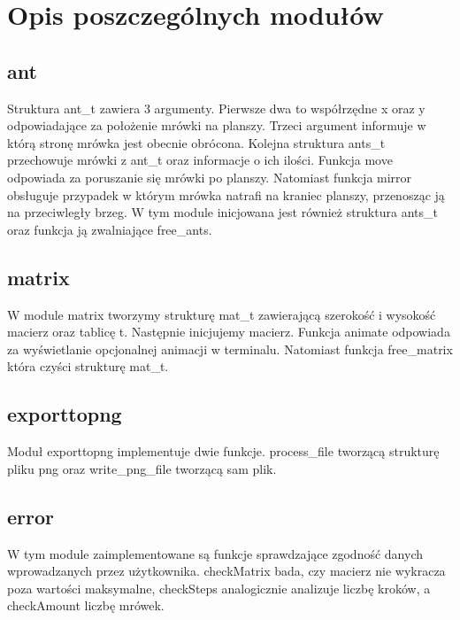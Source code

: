 \documentclass[a4paper,12pt]{article}
\begin{document}
\section{Opis poszczególnych modułów}
\subsection{ant}
Struktura ant\_t zawiera 3 argumenty. Pierwsze dwa to współrzędne x oraz y odpowiadające za położenie mrówki na planszy. Trzeci argument informuje w którą stronę mrówka jest obecnie obrócona. Kolejna struktura ants\_t przechowuje mrówki z ant\_t oraz informacje o ich ilości. Funkcja move odpowiada za poruszanie się mrówki po planszy. Natomiast funkcja mirror obsługuje przypadek w którym mrówka natrafi na kraniec planszy, przenosząc ją na przeciwległy brzeg. W tym module inicjowana jest również struktura ants\_t oraz funkcja ją zwalniające free\_ants.
\subsection{matrix}
W module matrix tworzymy strukturę mat\_t zawierającą szerokość i wysokość macierz oraz tablicę t.
Następnie inicjujemy macierz. Funkcja animate odpowiada za wyświetlanie opcjonalnej animacji w terminalu. Natomiast funkcja free\_matrix która czyści strukturę mat\_t.
\subsection{exporttopng}
Moduł exporttopng implementuje dwie funkcje. process\_file tworzącą strukturę pliku png oraz write\_png\_file tworzącą sam plik.
\subsection{error}
W tym module zaimplementowane są funkcje sprawdzające zgodność danych wprowadzanych przez użytkownika. checkMatrix bada, czy macierz nie wykracza poza wartości maksymalne, checkSteps analogicznie analizuje liczbę kroków, a checkAmount liczbę mrówek.%
\newpage
\end{document}
